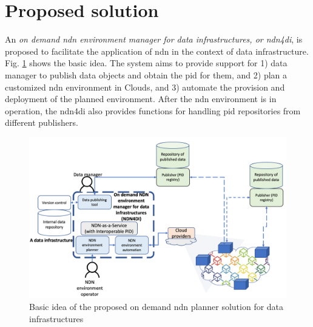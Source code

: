 \documentclass[conference]{IEEEtran}
\begin{document}
 

\section{Proposed solution}
An \emph{on demand \gls{ndn} environment manager for data infrastructures, or \gls{ndn4di}}, is proposed to facilitate the application of \gls{ndn} in the context of data infrastructure. Fig. \ref{fig:architecture-new} shows the basic idea. The system aims to provide support for 1) data manager to publish data objects and obtain the \gls{pid} for them, and 2) plan a customized \gls{ndn} environment in Clouds, and 3) automate the provision and deployment of the planned environment. After the \gls{ndn} environment is in operation, the \gls{ndn4di} also provides functions for handling \gls{pid} repositories from different publishers.  

\begin{figure}[ht]
\centering
\includegraphics[width=\columnwidth]{images/NDN-pub-planner.png}
\caption{Basic idea of the proposed on demand \gls{ndn} planner solution for data infrastructures}
\label{fig:architecture-new}
\end{figure}
\end{document}
